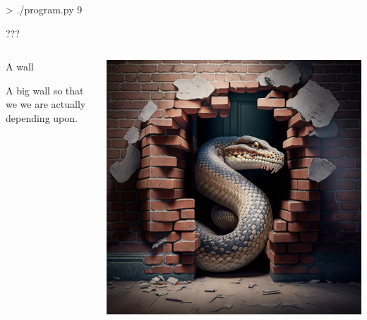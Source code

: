 \documentclass{slide}
\begin{document}
\begin{frame}[fragile]
    \begin{code}[numbers=none]{}
> ./program.py
9
    \end{code}
    \pause
    ???
\end{frame}


\begin{frame}
    \vspace{-2em}
    \begin{columns}
    \begin{column}{0.4\textwidth}
    {\color{primary}\large A wall}
    \vspace{1em}

    A big wall so that we
     we are actually depending upon.
    \end{column}
    \begin{column}{0.6\textwidth}
    \begin{center}
    \includegraphics[height=0.95\textheight]{images/python-wall}
    \end{center}
    \end{column}
    \end{columns}
\end{frame}
\end{document}
